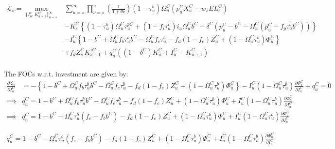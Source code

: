 \begin{equation}
\label{eqn:lagrangian}
\begin{split}
\mathcal{L}_{s} = \max_{\{I^{c}_{u},K^{C}_{u+1}\}^{\infty}_{u=s}} &  \sum_{u=s}^{\infty} \prod_{\nu=s}^{u}\left(\frac{1}{1+\theta{\nu}}\right) (1-\tau^{b}_{u})\Omega^{C}_{u}(p^{C}_{u}X^{C}_{u}-w_{s}EL^{C}_{s})  \\ 
 & - K^{C}_{s} \left\{(1-\tau^{b}_{u})\Omega^{C}_{u}\tau^{pC}_{u}+(1-f_{i}\tau^{i}_{u})i_{u}\Omega^{C}_{u}b^{C}-\delta^{C}(p^{C}_{u}-b^{C}-\Omega^{C}_{u}(p^{C}_{u}-f_{p}\tau^{b}_{u}b^{C}))\right\}  \\
 & - I^{C}_{u}\left\{1-b^{C}+\Omega^{C}_{u}f_{b}\tau^{b}_{u}b^{C}-\Omega^{C}_{u}f_{e}\tau^{b}_{u} - f_{d}(1-f_{e})Z^{C}_{u} + (1-\Omega^{C}_{u}\tau^{b}_{u})\Phi^{C}_{u}\right\} \\
 &  + f_{d}Z^{C}_{s}K^{\tau C}_{s-1} + q^{C}_{u}((1-\delta^{C})K^{C}_{u} + I^{C}_{u}-K^{C}_{u+1})\\
\end{split}
\end{equation}

The FOCs w.r.t. investment are given by:
 \begin{equation}
\label{eqn:foc_i}
\begin{split}
\frac{\partial \mathcal{L}_{s}}{\partial I^{C}_{u}} & = -\left\{1-b^{C}+\Omega^{C}_{u}f_{b}\tau^{b}_{u}b^{C}-\Omega^{C}_{u}f_{e}\tau^{b}_{u} - f_{d}(1-f_{e})Z^{C}_{u} + (1-\Omega^{C}_{u}\tau^{b}_{u})\Phi^{C}_{u}\right\} - I^{C}_{u}(1-\Omega^{C}_{u}\tau^{b}_{u})\frac{\partial \Phi^{C}_{u}}{\partial I^{C}_{u}} + q^{C}_{u} = 0 \\
\implies & q^{C}_{u}  = 1-b^{C}+\Omega^{C}_{u}f_{b}\tau^{b}_{u}b^{C}-\Omega^{C}_{u}f_{e}\tau^{b}_{u} - f_{d}(1-f_{e})Z^{C}_{u} + (1-\Omega^{C}_{u}\tau^{b}_{u})\Phi^{C}_{u} +  I^{C}_{u}(1-\Omega^{C}_{u}\tau^{b}_{u})\frac{\partial \Phi^{C}_{u}}{\partial I^{C}_{u}} \\
\implies & q^{C}_{u}  = 1-b^{C}-\Omega^{C}_{u}\tau^{b}_{u}(f_{e}-f_{b}b^{C}) - f_{d}(1-f_{e})Z^{C}_{u} + (1-\Omega^{C}_{u}\tau^{b}_{u})\Phi^{C}_{u} +  I^{C}_{u}(1-\Omega^{C}_{u}\tau^{b}_{u})\frac{\partial \Phi^{C}_{u}}{\partial I^{C}_{u}} 
\end{split}
\end{equation}

 \begin{equation}
\label{eqn:opt_i}
\begin{split}
 q^{C}_{u}  = 1-b^{C}-\Omega^{C}_{u}\tau^{b}_{u}(f_{e}-f_{b}b^{C}) - f_{d}(1-f_{e})Z^{C}_{u} + (1-\Omega^{C}_{u}\tau^{b}_{u})\Phi^{C}_{u} +  I^{C}_{u}(1-\Omega^{C}_{u}\tau^{b}_{u})\frac{\partial \Phi^{C}_{u}}{\partial I^{C}_{u}} 
\end{split}
\end{equation}

